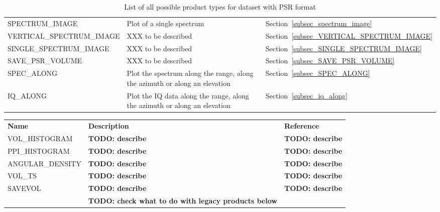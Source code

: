 \documentclass[a4paper,11pt,pdftex,twoside]{scrartcl}
\renewcommand{\bf}{\normalfont \bfseries}
\begin{document}
{{{\begin{table}[H]
\begin{tabularx}{\textwidth}{lXl}
SPECTRUM\_IMAGE & Plot of a single spectrum & Section~\ref{subsec_spectrum_image}\\
VERTICAL\_SPECTRUM\_IMAGE & XXX to be described & Section~\ref{subsec_VERTICAL_SPECTRUM_IMAGE}\\
SINGLE\_SPECTRUM\_IMAGE   & XXX to be described & Section~\ref{subsec_SINGLE_SPECTRUM_IMAGE}\\
SAVE\_PSR\_VOLUME         & XXX to be described & Section~\ref{subsec_SAVE_PSR_VOLUME}\\
SPEC\_ALONG               & Plot the spectrum along the range, along
                            the azimuth or along an elevation  & Section~\ref{subsec_SPEC_ALONG}\\
IQ\_ALONG               & Plot the IQ data along the range, along
                            the azimuth or along an elevation  & Section~\ref{subsec_iq_along}\\
\end{tabularx}
\caption{List of all possible product types for dataset with PSR format}
\label{tab_products_PSR}
\end{table}

\begin{table}[H]
\begin{tabularx}{\textwidth}{lXl}
{\bf Name} & {\bf Description} & {\bf Reference}\\
VOL\_HISTOGRAM & {\bf TODO: describe} & {\bf TODO: describe} \\
PPI\_HISTOGRAM & {\bf TODO: describe} & {\bf TODO: describe} \\
ANGULAR\_DENSITY & {\bf TODO: describe} & {\bf TODO: describe} \\
VOL\_TS & {\bf TODO: describe} & {\bf TODO: describe} \\
SAVEVOL & {\bf TODO: describe} & {\bf TODO: describe} \\

& {\bf TODO: check what to do with legacy products below} & \\


\end{tabularx}
\end{table}}}}
\end{document}
